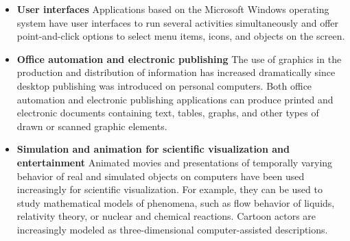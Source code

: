 \begin{itemize}
	\item \textbf{User interfaces}
	Applications based on the Microsoft Windows operating system have user interfaces to run several activities simultaneously and offer point-and-click options to select menu items, icons, and objects on the screen.
	
	\item \textbf{Office automation and electronic publishing}
	The use of graphics in the production and distribution of information has increased dramatically since desktop publishing was introduced on personal computers. Both office automation and electronic publishing applications can produce printed and electronic documents containing text, tables, graphs, and other types of drawn or scanned graphic elements. 
	
	\item \textbf{Simulation and animation for scientific visualization and entertainment}
	Animated movies and presentations of temporally varying behavior of real and simulated objects on computers have been used increasingly for scientific visualization. For example, they can be used to study mathematical models of phenomena, such as flow behavior of liquids, relativity theory, or nuclear and chemical reactions. Cartoon actors are increasingly modeled as three-dimensional computer-assisted descriptions. 
\end{itemize}

